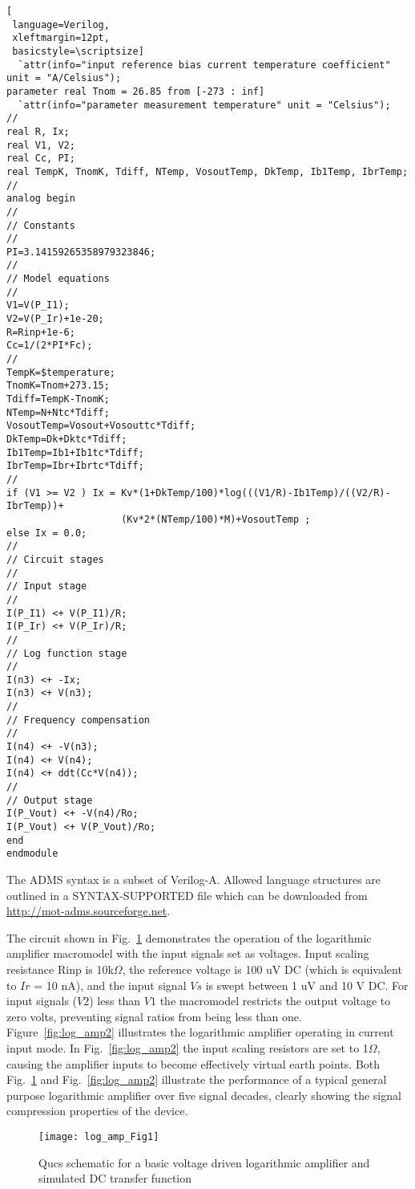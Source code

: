 \begin{lstlisting}[
 language=Verilog, 
 xleftmargin=12pt,
 basicstyle=\scriptsize]
  `attr(info="input reference bias current temperature coefficient" unit = "A/Celsius");
parameter real Tnom = 26.85 from [-273 : inf]
  `attr(info="parameter measurement temperature" unit = "Celsius");
//
real R, Ix;
real V1, V2;
real Cc, PI;
real TempK, TnomK, Tdiff, NTemp, VosoutTemp, DkTemp, Ib1Temp, IbrTemp;
//
analog begin
//
// Constants
//
PI=3.14159265358979323846;
//
// Model equations
//
V1=V(P_I1);
V2=V(P_Ir)+1e-20;
R=Rinp+1e-6;
Cc=1/(2*PI*Fc);
//
TempK=$temperature;
TnomK=Tnom+273.15;
Tdiff=TempK-TnomK;
NTemp=N+Ntc*Tdiff;
VosoutTemp=Vosout+Vosouttc*Tdiff;
DkTemp=Dk+Dktc*Tdiff;
Ib1Temp=Ib1+Ib1tc*Tdiff;
IbrTemp=Ibr+Ibrtc*Tdiff;
//
if (V1 >= V2 ) Ix = Kv*(1+DkTemp/100)*log(((V1/R)-Ib1Temp)/((V2/R)-IbrTemp))+
                    (Kv*2*(NTemp/100)*M)+VosoutTemp ;
else Ix = 0.0;
//
// Circuit stages
//
// Input stage
//
I(P_I1) <+ V(P_I1)/R;
I(P_Ir) <+ V(P_Ir)/R;
//
// Log function stage
//
I(n3) <+ -Ix;
I(n3) <+ V(n3);
//
// Frequency compensation
//
I(n4) <+ -V(n3);
I(n4) <+ V(n4);
I(n4) <+ ddt(Cc*V(n4));
//
// Output stage
I(P_Vout) <+ -V(n4)/Ro;
I(P_Vout) <+ V(P_Vout)/Ro;
end
endmodule

\end{lstlisting}

The ADMS syntax is a subset of Verilog-A.  Allowed language structures
are outlined in a SYNTAX-SUPPORTED file which can be downloaded from
\url{http://mot-adms.sourceforge.net}.



The circuit shown in Fig.~\ref{fig:log_amp1} demonstrates the operation
of the logarithmic amplifier macromodel with the input signals set as
voltages. Input scaling resistance Rinp is 10k$\Omega$, the reference
voltage is 100 uV DC (which is equivalent to $Ir$ = 10 nA), and the
input signal $Vs$ is swept between 1 uV and 10 V DC. For input signals
($V2$) less than $V1$ the macromodel restricts the output voltage to
zero volts, preventing signal ratios from being less than one.
Figure~\ref{fig:log_amp2} illustrates the logarithmic amplifier
operating in current input mode. In Fig.~\ref{fig:log_amp2} the input
scaling resistors are set to 1$\Omega$, causing the amplifier inputs
to become effectively virtual earth points. Both
Fig.~\ref{fig:log_amp1} and Fig.~\ref{fig:log_amp2} illustrate the
performance of a typical general purpose logarithmic amplifier over
five signal decades, clearly showing the signal compression properties
of the device.

 \begin{figure}
  \centering
  \texttt{[image: log\_amp\_Fig1]}
  \caption{Qucs schematic for a basic voltage driven logarithmic amplifier and simulated DC transfer function}
  \label{fig:log_amp1}
\end{figure} 

